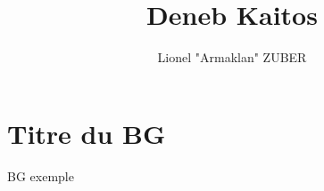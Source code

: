 \documentclass{DenebClass}
\title{Deneb Kaitos}
\author{Lionel "Armaklan" ZUBER}
\begin{document}
    \part{Titre du BG}
    BG exemple
\end{document}
